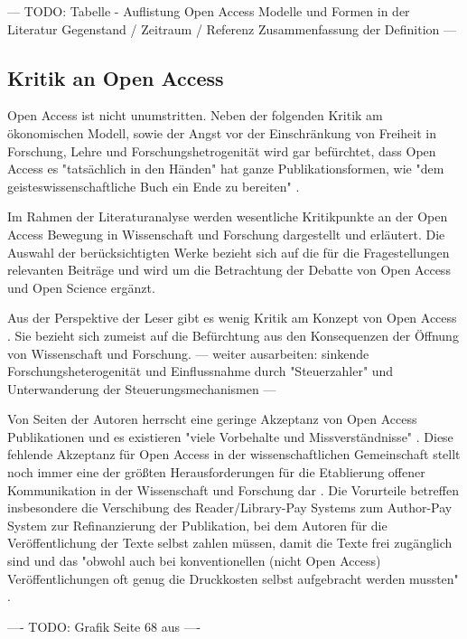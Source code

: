 --- TODO: Tabelle - Auflistung Open Access  Modelle und Formen in der Literatur Gegenstand / Zeitraum / Referenz Zusammenfassung der Definition ---

\subsection{Kritik an Open Access}

Open Access ist nicht unumstritten. Neben der folgenden Kritik am ökonomischen Modell, sowie der Angst vor der Einschränkung von Freiheit in Forschung, Lehre und Forschungshetrogenität wird gar befürchtet, dass Open Access es "tatsächlich in den Händen" hat ganze Publikationsformen, wie "dem geisteswissenschaftliche Buch ein Ende zu bereiten" \cite{Hirschi_2015_buch_oa}.

Im Rahmen der Literaturanalyse werden wesentliche Kritikpunkte an der Open Access Bewegung in Wissenschaft und Forschung dargestellt und erläutert. Die Auswahl der berücksichtigten Werke bezieht sich auf die für die Fragestellungen relevanten Beiträge und wird um die Betrachtung der Debatte von Open Access und Open Science ergänzt. 

Aus der Perspektive der Leser gibt es wenig Kritik am Konzept von Open Access \cite{weishaupt_2009_goldenOA}. Sie bezieht sich zumeist auf die Befürchtung aus den Konsequenzen der Öffnung von Wissenschaft und Forschung.
--- weiter ausarbeiten: sinkende Forschungsheterogenität und Einflussnahme durch "Steuerzahler" und Unterwanderung der Steuerungsmechanismen ---

Von Seiten der Autoren herrscht eine geringe Akzeptanz von Open Access Publikationen und es existieren "viele Vorbehalte und Missverständnisse" \cite{Suber_2002}. Diese fehlende Akzeptanz für Open Access in der wissenschaftlichen Gemeinschaft stellt noch immer eine der größten Herausforderungen für die Etablierung offener Kommunikation in der Wissenschaft und Forschung dar \cite{weishaupt_2009_goldenOA}. Die Vorurteile betreffen insbesondere die Verschibung des Reader/Library-Pay Systems zum Author-Pay System \cite{EuropeanCommission_sciencepub_2006} zur Refinanzierung der Publikation, bei dem Autoren für die Veröffentlichung der Texte selbst zahlen müssen, damit die Texte frei zugänglich sind \cite{suchen} und das "obwohl auch bei konventionellen (nicht Open Access) Veröffentlichungen oft genug die Druckkosten selbst aufgebracht werden mussten" \cite{weishaupt_2009_goldenOA}.

---- TODO: Grafik Seite 68 aus \cite{EuropeanCommission_sciencepub_2006} ----

